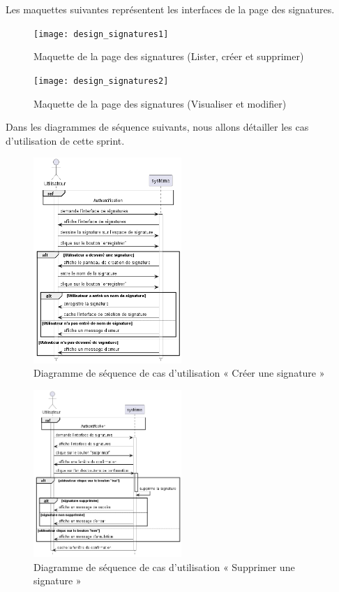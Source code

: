 Les maquettes suivantes représentent les interfaces de la page des signatures.

\begin{figure}[H]
  \centering
  \texttt{[image: design\_signatures1]}
  \caption{Maquette de la page des signatures (Lister, créer et supprimer)}
  \label{fig:design_signatures}
\end{figure}

\begin{figure}[H]
  \centering
  \texttt{[image: design\_signatures2]}
  \caption{Maquette de la page des signatures (Visualiser et modifier)}
  \label{fig:design_preview_delete_signature}
\end{figure}

Dans les diagrammes de séquence suivants, nous allons détailler les cas d'utilisation de cette sprint.

\begin{figure}[H]
  \centering
  \includegraphics[width=0.5\textwidth]{out/diagrams/signatures/create/create_signature}
  \caption{Diagramme de séquence de cas d'utilisation « Créer une signature  »}
  \label{fig:sequence_create_signature}
\end{figure}

\begin{figure}[H]
  \centering
  \includegraphics[width=0.5\textwidth]{out/diagrams/signatures/delete/delete_signature}
  \caption{Diagramme de séquence de cas d'utilisation « Supprimer une signature  »}
  \label{fig:sequence_delete_signature}
\end{figure}

